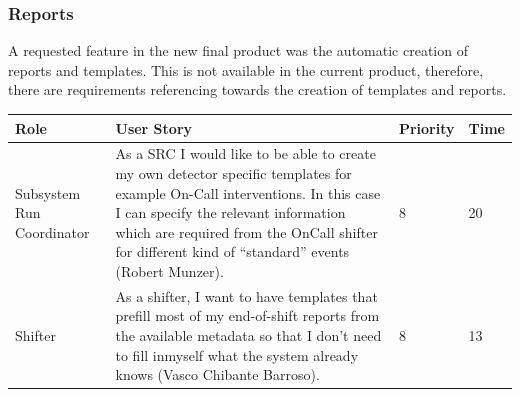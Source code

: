 \documentclass[paper=a4, fontsize=11pt,twoside]{scrartcl}	%
\begin{document}
\subsubsection{Reports}
A requested feature in the new final product was the automatic creation of reports and templates. This is not available in the current product, therefore, there are requirements referencing towards the creation of templates and reports.
\begin{longtable}{ | p{3cm} | p{8cm} | p{1cm} | l |}
\hline
Role & User Story & Priority & Time \\ \hline
Subsystem Run Coordinator & As a SRC I would like to be able to create my own detector specific templates for example On-Call interventions. In this case I can specify the relevant information which are required from the OnCall shifter for different kind of “standard” events (Robert Munzer). & 8 & 20 \\ \hline
Shifter &  As a shifter, I want to have templates that prefill most of my end-of-shift reports from the available metadata so that I don’t need to fill inmyself what the system already knows (Vasco Chibante Barroso). & 8 & 13 \\ \hline
\end{longtable}
\end{document}

